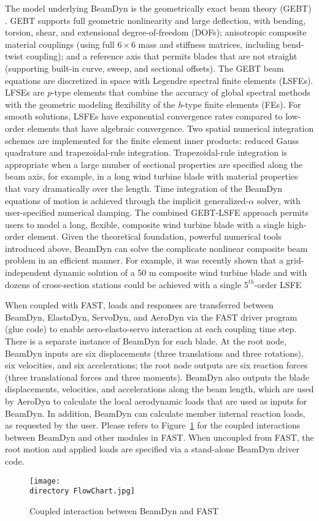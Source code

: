 The model underlying BeamDyn is the geometrically exact beam theory (GEBT) .   
GEBT supports full geometric nonlinearity and large deflection, with bending, torsion, shear, and extensional degree-of-freedom (DOFs); anisotropic composite material couplings (using full $6 \times 6$ mass and stiffness matrices, including bend-twist coupling); and a reference axis that permits blades that are not straight (supporting built-in curve, sweep, and sectional offsets). 
The GEBT beam equations are discretized in space with Legendre spectral finite elements (LSFEs).  
LFSEs are {\it p}-type elements that combine the accuracy of global spectral methods with the geometric modeling flexibility of the {\it h}-type finite elements (FEs). 
For smooth solutions, LSFEs have exponential convergence rates compared to low-order elements that have algebraic convergence. 
Two spatial numerical integration schemes are implemented for the finite element inner products: reduced Gauss quadrature and trapezoidal-rule integration.  
Trapezoidal-rule integration is appropriate when a large number of sectional properties are specified along the beam axis, for example, in a long wind turbine blade with material properties that vary dramatically over the length.  
Time integration of the BeamDyn equations of motion is achieved through the implicit generalized-$\alpha$ solver, with user-specified numerical damping.
The combined GEBT-LSFE  approach permits users to model a long, flexible, composite wind turbine blade with a single high-order element.  
Given the theoretical foundation, powerful numerical tools introduced above, BeamDyn can solve the complicate nonlinear composite beam problem in an efficient manner. For example, it was recently shown that a grid-independent dynamic solution of a 50 m composite wind turbine blade and with dozens of cross-section stations could be achieved with a 
single $5^{th}$-order LSFE 

When coupled with FAST, loads and responses are transferred between BeamDyn, ElastoDyn, ServoDyn, and AeroDyn via the FAST driver program (glue code) to enable aero-elasto-servo interaction at each coupling time step. 
There is a separate instance of BeamDyn for each blade. 
At the root node, BeamDyn inputs are six displacements (three translations and three rotations), six velocities, and six accelerations; the root node outputs are six reaction forces (three translational forces and three moments). 
BeamDyn also outputs the blade displacements, velocities, and accelerations along the beam length, which are used by AeroDyn to calculate the local aerodynamic loads that are used as inputs for BeamDyn. 
In addition, BeamDyn can calculate member internal reaction loads, as requested by the user. 
Please refers to Figure~\ref{fig:FlowChart} for the coupled interactions between BeamDyn and other modules in FAST. 
When uncoupled from FAST, the root motion and applied loads are specified via a stand-alone BeamDyn driver code.
\begin{figure}
    \centering
    \texttt{[image: \\directory FlowChart.jpg]}
    \caption{Coupled interaction between BeamDyn and FAST}
    \label{fig:FlowChart}
\end{figure}

